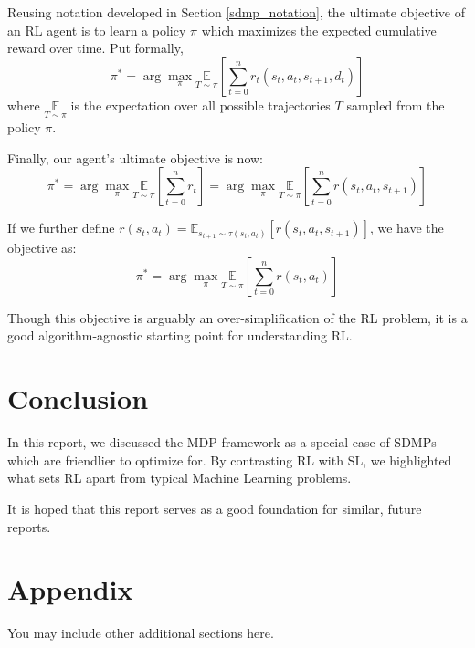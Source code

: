 \documentclass{article} %
\begin{document}
Reusing notation developed in Section \ref{sdmp_notation}, the ultimate objective of an RL agent is to learn a policy $\pi$ which maximizes the expected cumulative reward over time. Put formally,
\begin{equation} \label{sdmp_obj}
      \pi^* = \arg\max_\pi \underset{T \sim \pi}{\mathbb{E}} \left[ \sum_{t=0}^{n} r_t(s_t, a_t, s_{t+1}, d_t) \right]
\end{equation}
where $\underset{T \sim \pi}{\mathbb{E}}$ is the expectation over all possible trajectories $T$ sampled from the policy $\pi$.

Finally, our agent's ultimate objective is now:
\begin{equation} \label{mdp_obj}
    \pi^* = \arg\max_\pi \underset{T \sim \pi}{\mathbb{E}} \left[ \sum_{t=0}^{n} r_t \right] = \arg\max_\pi \underset{T \sim \pi}{\mathbb{E}} \left[ \sum_{t=0}^{n} r(s_t, a_t, s_{t + 1}) \right]
\end{equation}

If we further define $r(s_t, a_t) = \mathbb{E}_{s_{t + 1} \sim \tau(s_t, a_t)}[r(s_t, a_t, s_{t + 1})]$, 
we have the objective as:
\begin{equation} \label{mdp_obj_concise}
   \pi^* = \arg\max_\pi \underset{T \sim \pi}{\mathbb{E}} \left[ \sum_{t=0}^{n} r(s_t, a_t) \right]
\end{equation}

Though this objective is arguably an over-simplification of the RL problem,
it is a good algorithm-agnostic starting point for understanding RL.

\section{Conclusion}

In this report, we discussed the MDP framework as a special case of SDMPs which are friendlier to optimize for.
By contrasting RL with SL, we highlighted what sets RL apart from typical Machine Learning problems.

It is hoped that this report serves as a good foundation for similar, future reports.




\appendix
\section{Appendix}
You may include other additional sections here.
\end{document}
